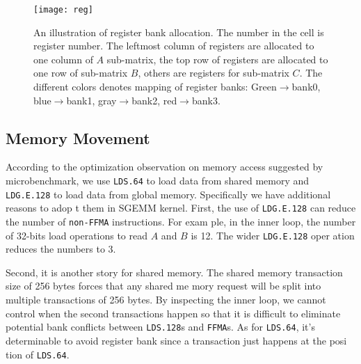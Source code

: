 \begin{figure}[htbp]
\begin{center}
\texttt{[image: reg]}
\caption{An illustration of register bank allocation. The number in the cell is register number.
    The leftmost column of registers are allocated to one column of $A$ sub-matrix, the
top row of registers are allocated to one row of sub-matrix $B$, others are registers for
sub-matrix $C$. The different colors denotes mapping of register banks: Green$\rightarrow$bank0, blue$\rightarrow$bank1,
 gray$\rightarrow$bank2, red$\rightarrow$bank3.}
\label{fig:reg}
\end{center}
\end{figure}


\subsection{Memory Movement}
According to the optimization observation on memory access suggested by microbenchmark, we use {\tt LDS.64} to load data
 from shared memory and {\tt LDG.E.128} to load data from global memory. Specifically we have additional reasons to adop
t them in SGEMM kernel. First, the use of {\tt LDG.E.128} can reduce the number of {\tt non-FFMA} instructions. For exam
ple,  in the inner loop, the number of 32-bits load operations to read $A$ and $B$ is 12. The wider {\tt LDG.E.128} oper
ation reduces the numbers to 3.

Second, it is another story for shared memory. The shared memory transaction size of 256 bytes forces that any shared me
mory request will be split into multiple transactions of 256 bytes. By inspecting the inner loop, we cannot control when
 the second transactions happen so that it is difficult to eliminate potential bank conflicts between {\tt LDS.128}s and
 {\tt FFMA}s. As for {\tt LDS.64}, it's determinable to avoid register bank since a transaction just happens at the posi
tion of {\tt LDS.64}.

